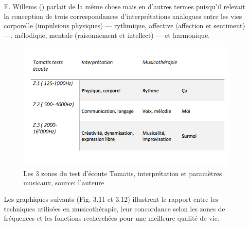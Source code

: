  E. Willems (\citeyear{willems})
parlait de la même chose mais en d'autres termes puisqu'il relevait la conception de trois 
correspondances d'interprétations 
analogues entre les vies
corporelle (impulsions physiques)
--- rythmique, affective (affection et sentiment) ---, mélodique, mentale
(raisonnement et intellect) --- et  harmonique.
\begin{figure}
	\centering
	\includegraphics[width=0.7\linewidth]{images/testinterpmusico}
	\caption[ L'interprétation des 3 zones et leur correspondance
	en musicothérapie]{Les 3 zones du
		test d'écoute Tomatis, interprétation et paramètres musicaux, source: l'auteure}
		\label{graphiquecolonnetestmusico}
\end{figure}

Les graphiques suivants (Fig. 3.11 et 3.12) illustrent le 
rapport entre les 
techniques 
utilisées en musicothérapie, leur concordance selon les zones de fréquences et les fonctions 
recherchées pour 
une meilleure qualité de vie.


